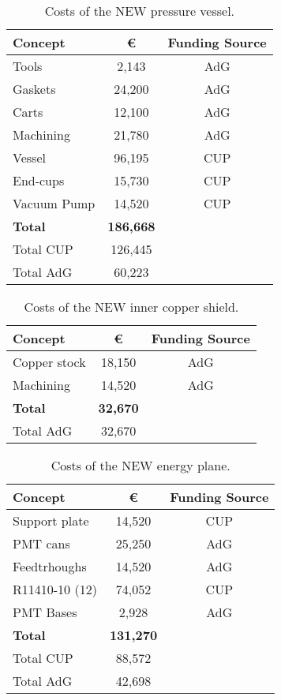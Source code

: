\begin{table}[h!]
\begin{center}
\begin{tabular}{|l|c|c|}
\hline
 Concept & \euro & Funding Source \\
 \hline
 Tools &	2,143 &	AdG \\
Gaskets & 24,200 &	AdG \\
Carts	& 12,100 &	AdG\\
Machining	 & 21,780 & 	AdG\\
Vessel	& 96,195 &	CUP \\
End-cups	& 15,730 &	CUP \\
Vacuum Pump	& 14,520 & CUP \\
 \hline
{\bf Total}	& {\bf186,668 }& \\	
Total CUP	& 126,445 & \\	
Total AdG	& 60,223 & \\	
 \hline\hline
\end{tabular}  
\caption{Costs of the NEW pressure vessel.}
\label{tab.new:PV}
\end{center}
\end{table} 

\begin{table}[h!]
\begin{center}
\begin{tabular}{|l|c|c|}
\hline
 Concept & \euro & Funding Source \\
 \hline
 Copper stock &	18,150 &	AdG \\
Machining & 14,520 &	AdG \\
 \hline
{\bf Total} &	{\bf 32,670} & \\		
Total AdG	& 32,670 & \\	
 \hline\hline
\end{tabular}  
\caption{Costs of the NEW inner copper shield.}
\label{tab.new:ICS}
\end{center}
\end{table} 

\begin{table}[h!]
\begin{center}
\begin{tabular}{|l|c|c|}
\hline
 Concept & \euro & Funding Source \\
 \hline
Support plate	&	14,520 &	CUP \\
PMT cans &	25,250 &	AdG\\
Feedtrhoughs &	14,520 &	AdG \\
R11410-10 (12) &	74,052 &	CUP \\
PMT Bases &		 2,928 &	AdG\\
  \hline
{\bf Total}	&	{\bf 131,270}	& \\
Total CUP	&	88,572	&\\
Total AdG	&	42,698 & \\	
 \hline\hline
\end{tabular}  
\caption{Costs of the NEW energy plane.}
\label{tab.new:EP}
\end{center}
\end{table}

